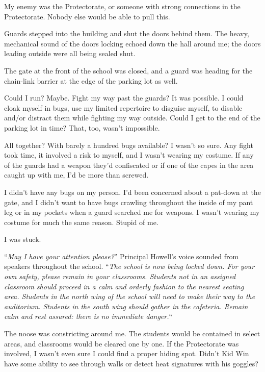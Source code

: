 My enemy was the Protectorate, or someone with strong connections in the Protectorate.  Nobody else would be able to pull this.



Guards stepped into the building and shut the doors behind them.  The heavy, mechanical sound of the doors locking echoed down the hall around me; the doors leading outside were all being sealed shut.



The gate at the front of the school was closed, and a guard was heading for the chain-link barrier at the edge of the parking lot as well.



Could I run?  Maybe.  Fight my way past the guards?  It was possible.  I could cloak myself in bugs, use my limited repertoire to disguise myself, to disable and/or distract them while fighting my way outside.  Could I get to the end of the parking lot in time?  That, too, wasn't impossible.



All together?  With barely a hundred bugs available?  I wasn't so sure.  Any fight took time, it involved a risk to myself, and I wasn't wearing my costume.  If any of the guards had a weapon they'd confiscated or if one of the capes in the area caught up with me, I'd be more than screwed.



I didn't have any bugs on my person.  I'd been concerned about a pat-down at the gate, and I didn't want to have bugs crawling throughout the inside of my pant leg or in my pockets when a guard searched me for weapons.  I wasn't wearing my costume for much the same reason.  Stupid of me.



I was stuck.



``\emph{May I have your attention please?}''  Principal Howell's voice sounded from speakers throughout the school.  ``\emph{The school is now being locked down.  For your own safety, please remain in your classrooms.  Students not in an assigned classroom should proceed in a calm and orderly fashion to the nearest seating area.  Students in the north wing of the school will need to make their way to the auditorium.  Students in the south wing should gather in the cafeteria.  Remain calm and rest assured: there is no immediate danger.}``



The noose was constricting around me.  The students would be contained in select areas, and classrooms would be cleared one by one.  If the Protectorate was involved, I wasn't even sure I could find a proper hiding spot.  Didn't Kid Win have some ability to see through walls or detect heat signatures with his goggles?



